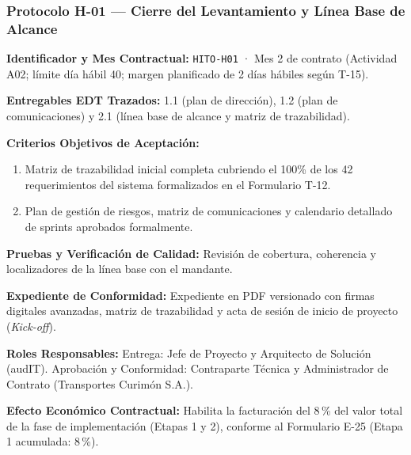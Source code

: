 \subsubsection*{Protocolo H-01 — Cierre del Levantamiento y Línea Base de Alcance}\label{sec:9-proto-h1}
\par\noindent\textbf{Identificador y Mes Contractual:} \texttt{HITO-H01} · Mes 2 de contrato (Actividad A02; límite día hábil 40; margen planificado de 2 días hábiles según T-15).\par
\par\noindent\textbf{Entregables EDT Trazados:} 1.1 (plan de dirección), 1.2 (plan de comunicaciones) y 2.1 (línea base de alcance y matriz de trazabilidad).\par
\par\noindent\textbf{Criterios Objetivos de Aceptación:}
\begin{enumerate}
  \item Matriz de trazabilidad inicial completa cubriendo el 100\% de los 42 requerimientos del sistema formalizados en el Formulario T-12.
  \item Plan de gestión de riesgos, matriz de comunicaciones y calendario detallado de sprints aprobados formalmente.
\end{enumerate}
\par\noindent\textbf{Pruebas y Verificación de Calidad:} Revisión de cobertura, coherencia y localizadores de la línea base con el mandante.\par
\par\noindent\textbf{Expediente de Conformidad:} Expediente en PDF versionado con firmas digitales avanzadas, matriz de trazabilidad y acta de sesión de inicio de proyecto (\textit{Kick-off}).\par
\par\noindent\textbf{Roles Responsables:} Entrega: Jefe de Proyecto y Arquitecto de Solución (audIT). Aprobación y Conformidad: Contraparte Técnica y Administrador de Contrato (Transportes Curimón S.A.).\par
\par\noindent\textbf{Efecto Económico Contractual:} Habilita la facturación del 8\,\% del valor total de la fase de implementación (Etapas 1 y 2), conforme al Formulario E-25 (Etapa 1 acumulada: 8\,\%).\par

